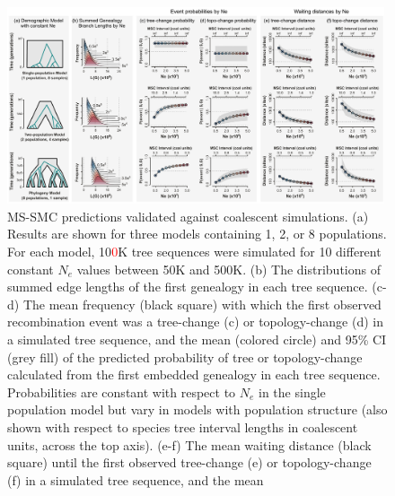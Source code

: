 \documentclass[11pt]{article}
\begin{document}
\begin{figure}[tp]
	\centering
	\includegraphics[width=0.99\textwidth]{figures/current/Fig5-validation-sims-NEW4.pdf}
	\caption{
		MS-SMC predictions validated against coalescent simulations.
		(a) Results are shown for three models containing 1, 2, or 8 
		populations. %
		For each model, 10\textcolor{red}{0}K tree sequences were simulated for 10 different
		constant $N_e$ values between 50K and 500K. 
		(b) The distributions of summed edge lengths of the first genealogy in 
		each tree sequence. 
		(c-d) The mean frequency (black square) with which the first observed 
		recombination event was a tree-change (c) or topology-change (d) in a 
		simulated tree sequence, and the mean (colored circle) and 95\% CI 
		(grey fill) of the predicted probability of tree or topology-change 
		calculated from the first embedded genealogy in each tree sequence. 
		Probabilities are constant with respect to $N_e$ in the single population
		model but vary in models with population structure
		(also shown with respect to species tree interval lengths in 
		coalescent units, across the top axis).
		(e-f) The mean waiting distance (black square) until the first observed 
		tree-change (e) or topology-change (f) in a simulated tree sequence, and the mean 
}
\end{figure}
\end{document}
